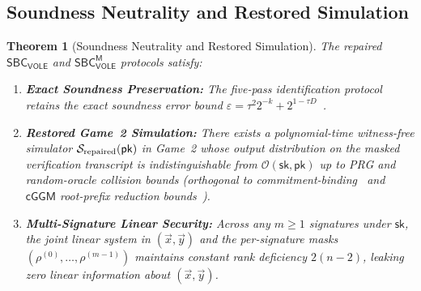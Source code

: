 \documentclass[11pt,a4paper]{article}
\newtheorem{theorem}{Theorem}
\theoremstyle{definition}
\theoremstyle{remark}
\newcommand{\SBCVOLE}{\mathsf{SBC}_{\mathsf{VOLE}}}
\newcommand{\SBCVOLEM}{\mathsf{SBC}_{\mathsf{VOLE}}^{\mathsf{M}}}
\newcommand{\pk}{\mathsf{pk}}
\newcommand{\sk}{\mathsf{sk}}
\newcommand{\cGGM}{\mathsf{cGGM}}
\begin{document}
\subsection{Soundness Neutrality and Restored Simulation}

\begin{theorem}[Soundness Neutrality and Restored Simulation]
\label{prop:repair-security}
The repaired $\SBCVOLE$ and $\SBCVOLEM$ protocols satisfy:
\begin{enumerate}[leftmargin=2em]
    \item \textbf{Exact Soundness Preservation:} The five-pass identification protocol retains the exact soundness error bound $\varepsilon = \tau^2 2^{-k} + 2^{1 - \tau D}$~\cite[Theorem~1]{HJ25}.
    \item \textbf{Restored Game~2 Simulation:} There exists a polynomial-time witness-free simulator $\mathcal{S}_{\textup{repaired}}(\pk)$ in Game~2 whose output distribution on the masked verification transcript is indistinguishable from $\mathcal{O}(\sk, \pk)$ up to PRG and random-oracle collision bounds (orthogonal to commitment-binding~\cite{KLS25} and $\cGGM$ root-prefix reduction bounds~\cite{KX26,FR26}).
    \item \textbf{Multi-Signature Linear Security:} Across any $m \ge 1$ signatures under $\sk$, the joint linear system in $(\vec{x}, \vec{y})$ and the per-signature masks $(\rho^{(0)}, \dots, \rho^{(m-1)})$ maintains constant rank deficiency $2(n-2)$, leaking zero linear information about $(\vec{x}, \vec{y})$.
\end{enumerate}
\end{theorem}
\end{document}
